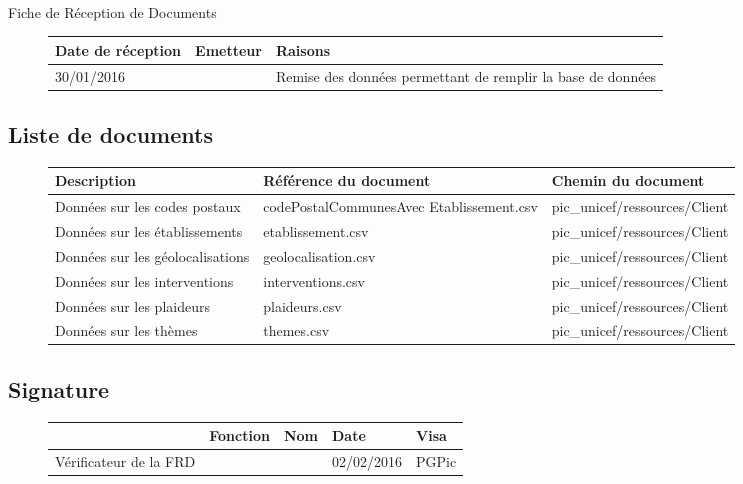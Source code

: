 \documentclass[asi, sansVersion]{picINSA}
\begin{document}
\begin{center}
\huge
\nomEquipe{}\\
Fiche de Réception de Documents\\
\end{center}
\vspace{0.5cm}


\begin{figure}[H]
		\centering
		\begin{tabularx}{17cm}{|X|X|X|}
		\hline
		\rowcolor[gray]{0.85}Date de réception & Emetteur & Raisons \\
		\hline
		30/01/2016 & \nomClient{} & Remise des données permettant de remplir la base de données\\
		\hline
		\end{tabularx}
\end{figure}

\subsection*{Liste de documents}

\begin{figure}[H]
		\centering
		\begin{tabularx}{17cm}{|X|X|X|}
		\hline
		\rowcolor[gray]{0.85} Description & Référence du document & Chemin du document \\
		\hline		
		Données sur les codes postaux & codePostalCommunesAvec Etablissement.csv & pic\_unicef/ressources/Client \\
		\hline
		Données sur les établissements & etablissement.csv & pic\_unicef/ressources/Client\\
		\hline
		Données sur les géolocalisations & geolocalisation.csv & pic\_unicef/ressources/Client\\
		\hline
		Données sur les interventions & interventions.csv & pic\_unicef/ressources/Client\\
		\hline
		Données sur les plaideurs & plaideurs.csv & pic\_unicef/ressources/Client\\
		\hline
		Données sur les thèmes & themes.csv & pic\_unicef/ressources/Client\\
		\hline
		\end{tabularx}
\end{figure}

\subsection*{Signature}

\begin{figure}[H]
		\centering
		\begin{tabularx}{17cm}{|p{4cm}|X|X|X|X|}
		\hline
		\rowcolor[gray]{0.85}& Fonction & Nom & Date & Visa \\
		\hline
		 Vérificateur de la FRD & \RGC & \Mathieu & 02/02/2016 & PGPic \\
		\hline
		\end{tabularx}
\end{figure}
\end{document}
